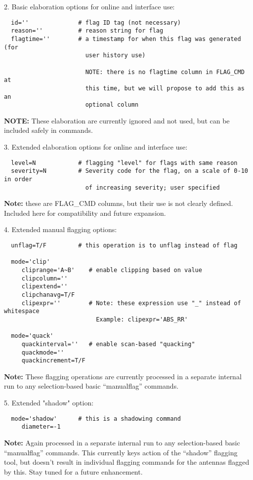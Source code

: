 2. Basic elaboration options for online and interface use:
\begin{verbatim}
  id=''              # flag ID tag (not necessary)
  reason=''          # reason string for flag
  flagtime=''        # a timestamp for when this flag was generated (for 
                       user history use)

                       NOTE: there is no flagtime column in FLAG_CMD at
                       this time, but we will propose to add this as an
                       optional column
\end{verbatim}
{\bf NOTE:} These elaboration are currently ignored and not used, but
can be included safely in commands.

3. Extended elaboration options for online and interface use:
\begin{verbatim}
  level=N            # flagging "level" for flags with same reason
  severity=N         # Severity code for the flag, on a scale of 0-10 in order 
                       of increasing severity; user specified
\end{verbatim}
{\bf Note:} these are FLAG\_CMD columns, but their use is not clearly
defined. Included here for compatibility and future expansion.

4. Extended manual flagging options:
\begin{verbatim}
  unflag=T/F         # this operation is to unflag instead of flag

  mode='clip'
     cliprange='A~B'    # enable clipping based on value
     clipcolumn=''
     clipextend=''
     clipchanavg=T/F
     clipexpr=''        # Note: these expression use "_" instead of whitespace
                          Example: clipexpr='ABS_RR'         

  mode='quack'
     quackinterval=''   # enable scan-based "quacking" 
     quackmode=''
     quackincrement=T/F
\end{verbatim}
{\bf Note:} These flagging operations are currently processed in a separate internal run
to any selection-based basic ``manualflag'' commands.

5. Extended "shadow" option:
\begin{verbatim}
  mode='shadow'      # this is a shadowing command
     diameter=-1
\end{verbatim}
{\bf Note:} Again processed in a separate internal run to any
selection-based basic ``manualflag'' commands.  This currently keys action
of the ``shadow'' flagging tool, but doesn't result in individual
flagging commands for the antennas flagged by this.  Stay tuned for
a future enhancement.

